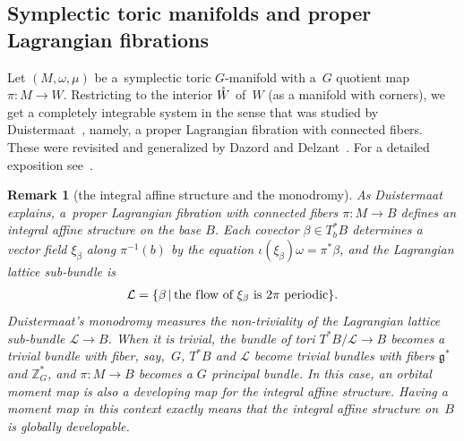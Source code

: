 \documentclass[pdftex]{sigma}
\numberwithin{equation}{section}
\newtheorem{Remark}[Lemma]{Remark}
\begin{document}
\subsection*{Symplectic toric manifolds and proper Lagrangian f\/ibrations}

Let $(M,\omega,\mu)$ be a~symplectic toric $G$-manifold
with a~$G$ quotient map $\pi \colon M \to W$.
Restricting to the interior ${\mathaccent23{W}}$ of~$W$ (as a manifold with corners),
we get a completely integrable system in the sense that was studied
by Duistermaat~\cite{Duis}, namely, a proper Lagrangian f\/ibration
with connected f\/ibers.
These were revisited and generalized by Dazord and Delzant~\cite{DD}.
For a detailed exposition see~\cite{LTB}.

\begin{Remark}[the integral af\/f\/ine structure and the monodromy]
As Duistermaat explains, a~proper Lagrangian f\/ibration
with connected f\/ibers $\pi \colon M \to B$
def\/ines an integral af\/f\/ine structure on the base $B$.  Each covector
$\beta \in T_b^*B$ determines a vector f\/ield $\xi_\beta$ along $\pi^{-1}(b)$
by the equation $\iota(\xi_\beta)\omega = \pi^* \beta$,
and the Lagrangian lattice sub-bundle is
\begin{gather*}
 {\mathcal L} =
   \{ \beta \, | \, \text{the f\/low of $\xi_\beta$ is $2\pi$ periodic} \}.
   \end{gather*}
Duistermaat's monodromy measures the non-triviality of the Lagrangian
lattice sub-bundle \mbox{${\mathcal L} \to B$}.
When it is trivial, the bundle of tori $T^*B/{\mathcal L} \to B$
becomes a trivial bundle with f\/iber, say,~$G$,
 $T^*B$ and ${\mathcal L}$ become trivial bundles
with f\/ibers ${\mathfrak g}^*$ and ${\mathbb Z}_G^*$,
and $\pi \colon M \to B$ becomes a $G$ principal bundle.
In this case, an orbital moment map is also
a developing map for the integral af\/f\/ine structure.  Having a moment map
in this context exactly means that the integral af\/f\/ine structure on~$B$
is globally developable.
\end{Remark}
\end{document}
